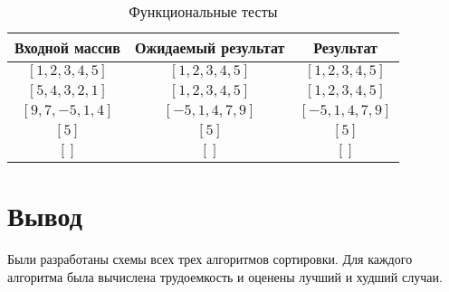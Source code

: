 \begin{table}[h]
	\begin{center}
		\caption{\label{tbl:functional_test} Функциональные тесты}
		\begin{tabular}{|c|c|c|}
			\hline
			Входной массив & Ожидаемый результат & Результат \\ 
			\hline
			$[1, 2, 3, 4, 5]$ & $[1, 2, 3, 4, 5]$  & $[1, 2, 3, 4, 5]$\\
			$[5, 4, 3, 2, 1]$  & $[1, 2, 3, 4, 5]$ & $[1, 2, 3, 4, 5]$\\
			$[9, 7, -5, 1, 4]$  & $[-5, 1, 4, 7, 9]$  & $[-5, 1, 4, 7, 9]$\\
			$[5]$  & $[5]$  & $[5]$\\
			$[]$  & $[]$  & $[]$\\
			\hline
		\end{tabular}
	\end{center}
\end{table}


\section*{Вывод}

Были разработаны схемы всех трех алгоритмов сортировки. Для каждого алгоритма была вычислена трудоемкость и оценены лучший и худший случаи.

